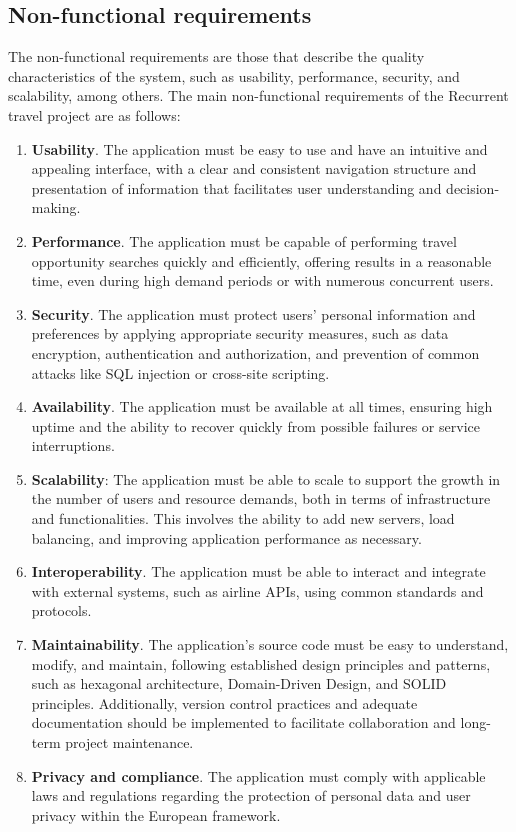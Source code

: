 \documentclass[../memory.tex]{subfiles}
\begin{document}
\subsection{Non-functional requirements}
The non-functional requirements are those that describe the quality
characteristics of the system, such as usability, performance, security, and
scalability, among others. The main non-functional requirements of the
Recurrent travel project are as follows:
\begin{enumerate}
	\item \textbf{Usability}. The application must be easy to use and have an intuitive
	      and appealing interface, with a clear and consistent navigation structure
	      and presentation of information that facilitates user understanding and
	      decision-making.
	\item \textbf{Performance}. The application must be capable of performing travel
	      opportunity searches quickly and efficiently, offering results in a
	      reasonable time, even during high demand periods or with numerous
	      concurrent users.
	\item \textbf{Security}. The application must protect users' personal information
	      and preferences by applying appropriate security measures, such as data
	      encryption, authentication and authorization, and prevention of common
	      attacks like SQL injection or cross-site scripting.
	\item \textbf{Availability}. The application must be available at all times,
	      ensuring high uptime and the ability to recover quickly from possible
	      failures or service interruptions.
	\item \textbf{Scalability}: The application must be able to scale to support the
	      growth in the number of users and resource demands, both in terms of
	      infrastructure and functionalities. This involves the ability to add new
	      servers, load balancing, and improving application performance as
	      necessary.
	\item \textbf{Interoperability}. The application must be able to interact and
	      integrate with external systems, such as airline APIs, using common
	      standards and protocols.
	\item \textbf{Maintainability}. The application's source code must be easy to
	      understand, modify, and maintain, following established design principles
	      and patterns, such as hexagonal architecture, Domain-Driven Design, and
	      SOLID principles. Additionally, version control practices and adequate
	      documentation should be implemented to facilitate collaboration and
	      long-term project maintenance.
	\item \textbf{Privacy and compliance}. The application must comply with applicable
	      laws and regulations regarding the protection of personal data and user
	      privacy within the European framework.
\end{enumerate}
\end{document}
